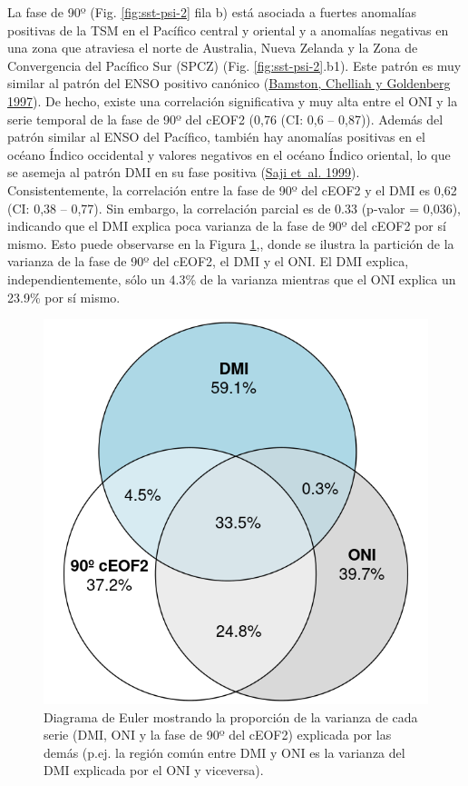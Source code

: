 \documentclass[12pt,oneside,a4paper]{reedthesis}
\begin{document}
La fase de 90º (Fig. \ref{fig:sst-psi-2} fila b) está asociada a fuertes anomalías positivas de la TSM en el Pacífico central y oriental y a anomalías negativas en una zona que atraviesa el norte de Australia, Nueva Zelanda y la Zona de Convergencia del Pacífico Sur (SPCZ) (Fig. \ref{fig:sst-psi-2}.b1).
Este patrón es muy similar al patrón del ENSO positivo canónico (\protect\hyperlink{ref-bamston1997}{Bamston, Chelliah y Goldenberg 1997}).
De hecho, existe una correlación significativa y muy alta entre el ONI y la serie temporal de la fase de 90º del cEOF2 (0,76 (CI: 0,6 -- 0,87)).
Además del patrón similar al ENSO del Pacífico, también hay anomalías positivas en el océano Índico occidental y valores negativos en el océano Índico oriental, lo que se asemeja al patrón DMI en su fase positiva (\protect\hyperlink{ref-saji1999}{Saji et~al. 1999}).
Consistentemente, la correlación entre la fase de 90º del cEOF2 y el DMI es 0,62 (CI: 0,38 -- 0,77).
Sin embargo, la correlación parcial es de 0.33 (p-valor = 0,036), indicando que el DMI explica poca varianza de la fase de 90º del cEOF2 por sí mismo.
Esto puede observarse en la Figura \ref{fig:euler},, donde se ilustra la partición de la varianza de la fase de 90º del cEOF2, el DMI y el ONI.
El DMI explica, independientemente, sólo un 4.3\% de la varianza mientras que el ONI explica un 23.9\% por sí mismo.

\begin{figure}

{\centering \includegraphics{figures/20-ceofs/euler-1} 

}

\caption{Diagrama de Euler mostrando la proporción de la varianza de cada serie (DMI, ONI y la fase de 90º del cEOF2) explicada por las demás (p.ej. la región común entre DMI y ONI es la varianza del DMI explicada por el ONI y viceversa).}\label{fig:euler}
\end{figure}
\end{document}
